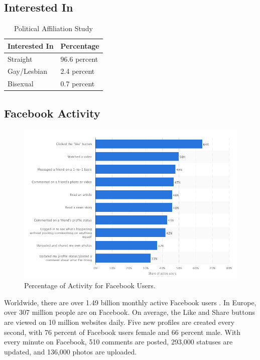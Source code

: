\documentclass{article}
\begin{document}
\subsection*{Interested In}
\begin{table}[H]
\centering
\begin{tabular}{|p{3cm}||p{3cm}|} 
 \hline
 Interested In & Percentage \\ [0.5ex] 
 \hline\hline
 Straight & 96.6 percent \\
 \hline
 Gay/Lesbian & 2.4 percent \\
 \hline
 Bisexual & 0.7 percent \\ [1ex] 
 \hline
\end{tabular}
\caption{Political Affiliation Study \cite{interestedinwebsite}}
\label{table:4}
\end{table}

\subsection*{Facebook Activity}
\begin{figure}[H]
  \includegraphics[width=\linewidth]{fbact.png}
  \caption{Percentage of Activity for Facebook Users. \cite{fbactwebsite}}
  \label{fig:fbact}
\end{figure}

Worldwide, there are over 1.49 billion monthly active Facebook users \cite{fbstatswebsite}. In Europe, over 307 million people are on Facebook. On average, the Like and Share buttons are viewed on 10 million websites daily. Five new profiles are created every second, with 76 percent of Facebook users female and 66 percent male. With every minute on Facebook, 510 comments are posted, 293,000 statuses are updated, and 136,000 photos are uploaded. \\
\end{document}
